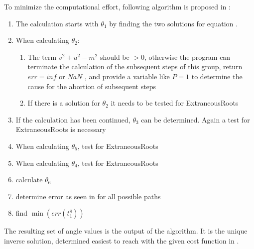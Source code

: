 To minimize the computational effort, following algorithm is proposed %
in \cite{invKinSolYanWu}:

\begin{enumerate}
	\item The calculation starts with $\theta_1$ by finding the two solutions for equation .
	\item When calculating $\theta_2$:
	\begin{enumerate}
		\item  The term $ v^2 + u^2 - m^2 $ should be $ > 0$, otherwise the program can terminate the calculation of the subsequent steps of this group, return $err = inf $ or $NaN $ , and provide a variable like $P=1$ to determine the cause for the abortion of subsequent steps
		\item If there is a solution for $\theta_2$ it needs to be tested for \glspl{ExtraneousRoot}
	\end{enumerate}
	\item If the calculation has been continued, $\theta_3$ can be determined. Again a test for \glspl{ExtraneousRoot} is necessary
	\item When calculating $\theta_5$, test for \glspl{ExtraneousRoot}
	\item When calculating $\theta_4$, test for \glspl{ExtraneousRoot}
	\item calculate $\theta_6$
	\item determine error as seen in  for all possible paths
	\item find $\min ( err(t_1^8))$ 
\end{enumerate}

The resulting set of angle values is the output of the algorithm. It is the unique inverse solution, determined easiest to reach with the given cost function in . 






